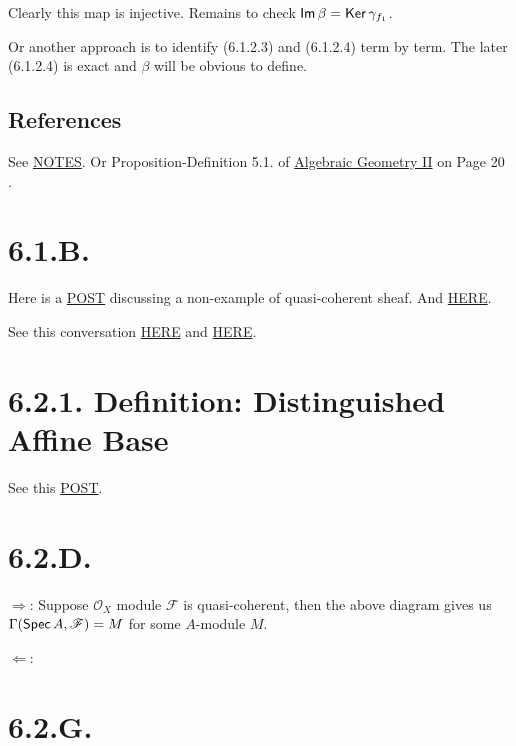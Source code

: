 Clearly this map is injective. Remains to check $\operatorname{\mathsf{Im}} \beta=\operatorname{\mathsf{Ker}} \gamma_{f_1}$.

Or another approach is to identify (6.1.2.3) and (6.1.2.4) term by term. The later (6.1.2.4) is exact and $\beta$ will be obvious to define. 

\subsection{References}

See \href{https://www.math.brown.edu/dabramov/MA/s1718/MA205-OModules.pdf}{NOTES}. Or Proposition-Definition 5.1. of \href{https://www.dam.brown.edu/people/mumford/alg_geom/papers/AGII.pdf}{Algebraic Geometry II} on Page 20 \cite{}.


\section{6.1.B.}

Here is a \href{https://math.stackexchange.com/questions/467197/examples-of-mathcalo-x-modules-that-are-not-quasi-coherent-sheaves}{POST} discussing a non-example of quasi-coherent sheaf. And \href{https://math.stackexchange.com/questions/976034/what-are-some-good-examples-of-non-quasicoherent-sheaves-not-satisfying-the-co}{HERE}.

See this conversation \href{https://gemini.google.com/share/e28bfdb519f7}{HERE} and \href{https://gemini.google.com/share/7f60e5ad2330}{HERE}.

\section{6.2.1. Definition: Distinguished Affine Base}

See this \href{https://math.stackexchange.com/questions/4304402/why-is-vakils-definition-of-distinguished-affine-base-of-a-scheme-not-a-base}{POST}.

\section{6.2.D.}

$\Rightarrow$: Suppose $\mathscr O_X$ module $\mathscr F$ is quasi-coherent, then the above diagram gives us $\Gamma(\operatorname{\mathsf{Spec}} A,\mathscr F)=M$ for some $A$-module $M$. 

$\Leftarrow$: 

\section{6.2.G.}


